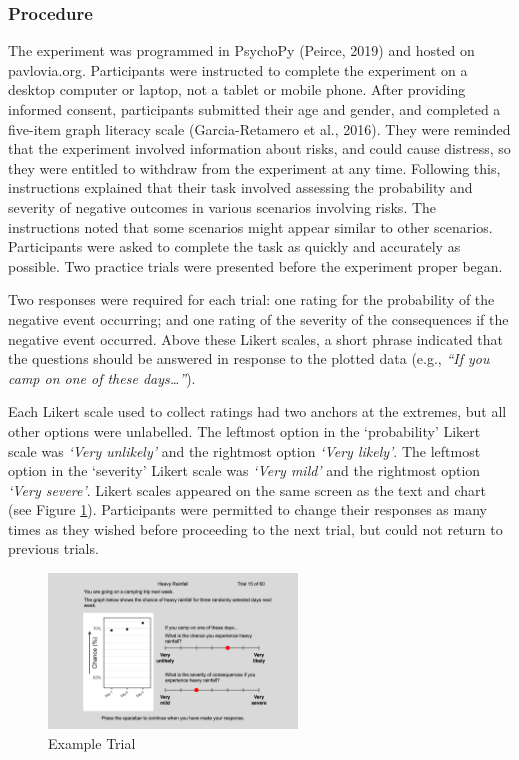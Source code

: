 \documentclass[journal]{vgtc}                %
\begin{document}
\hypertarget{procedure}{%
\subsubsection{Procedure}\label{procedure}}

The experiment was programmed in PsychoPy (Peirce, 2019) and hosted on pavlovia.org. Participants were instructed to complete the experiment on a desktop computer or laptop, not a tablet or mobile phone. After providing informed consent, participants submitted their age and gender, and completed a five-item graph literacy scale (Garcia-Retamero et al., 2016). They were reminded that the experiment involved information about risks, and could cause distress, so they were entitled to withdraw from the experiment at any time. Following this, instructions explained that their task involved assessing the probability and severity of negative outcomes in various scenarios involving risks. The instructions noted that some scenarios might appear similar to other scenarios. Participants were asked to complete the task as quickly and accurately as possible. Two practice trials were presented before the experiment proper began.

Two responses were required for each trial: one rating for the probability of the negative event occurring; and one rating of the severity of the consequences if the negative event occurred. Above these Likert scales, a short phrase indicated that the questions should be answered in response to the plotted data (e.g., \emph{``If you camp on one of these days\ldots{}''}).

Each Likert scale used to collect ratings had two anchors at the extremes, but all other options were unlabelled. The leftmost option in the `probability' Likert scale was \emph{`Very unlikely'} and the rightmost option \emph{`Very likely'}. The leftmost option in the `severity' Likert scale was \emph{`Very mild'} and the rightmost option \emph{`Very severe'}. Likert scales appeared on the same screen as the text and chart (see Figure \ref{fig:example-trial}). Participants were permitted to change their responses as many times as they wished before proceeding to the next trial, but could not return to previous trials.

\begin{figure}
\includegraphics[width=250px]{figures/example_trial} \caption{Example Trial}\label{fig:example-trial}
\end{figure}
\end{document}
